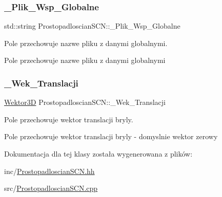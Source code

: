 \subsubsection{\texorpdfstring{\+\_\+\+Plik\+\_\+\+Wsp\+\_\+\+Globalne}{\_Plik\_Wsp\_Globalne}}
{\footnotesize\ttfamily std\+::string Prostopadloscian\+S\+C\+N\+::\+\_\+\+Plik\+\_\+\+Wsp\+\_\+\+Globalne\hspace{0.3cm}{\ttfamily [private]}}



Pole przechowuje nazwe pliku z danymi globalnymi. 

Pole przechowuje nazwe pliku z danymi globalnymi \mbox{\label{classProstopadloscianSCN_a4ca4e6e7fe68e627d4a3f6373f1482ad}} 
\subsubsection{\texorpdfstring{\+\_\+\+Wek\+\_\+\+Translacji}{\_Wek\_Translacji}}
{\footnotesize\ttfamily \hyperlink{classSWektor}{Wektor3D} Prostopadloscian\+S\+C\+N\+::\+\_\+\+Wek\+\_\+\+Translacji\hspace{0.3cm}{\ttfamily [private]}}



Pole przechowuje wektor translacji bryly. 

Pole przechowuje wektor translacji bryly -\/ domyslnie wektor zerowy 

Dokumentacja dla tej klasy została wygenerowana z plików\+:\begin{DoxyCompactItemize}
\item 
inc/\hyperlink{ProstopadloscianSCN_8hh}{Prostopadloscian\+S\+C\+N.\+hh}\item 
src/\hyperlink{ProstopadloscianSCN_8cpp}{Prostopadloscian\+S\+C\+N.\+cpp}\end{DoxyCompactItemize}
